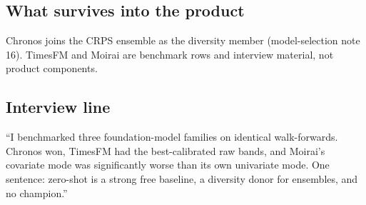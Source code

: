 \subsection{What survives into the product}

Chronos joins the CRPS ensemble as the diversity member
(model-selection note 16). TimesFM and Moirai are benchmark rows
and interview material, not product components.

\subsection{Interview line}

``I benchmarked three foundation-model families on identical
walk-forwards. Chronos won, TimesFM had the best-calibrated raw
bands, and Moirai's covariate mode was significantly worse than
its own univariate mode. One sentence: zero-shot is a strong free
baseline, a diversity donor for ensembles, and no champion.''
